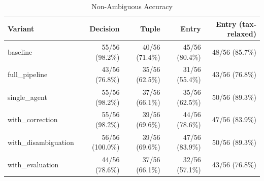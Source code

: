 \begin{table}[htbp]
\centering
\caption{Non-Ambiguous Accuracy}
\label{tab:acc-non-ambig}
\begin{tabular}{l rrrr}
\toprule
Variant & Decision & Tuple & Entry & Entry (tax-relaxed) \\
\midrule
  baseline & 55/56 (98.2\%) & 40/56 (71.4\%) & 45/56 (80.4\%) & 48/56 (85.7\%) \\
  full\_pipeline & 43/56 (76.8\%) & 35/56 (62.5\%) & 31/56 (55.4\%) & 43/56 (76.8\%) \\
  single\_agent & 55/56 (98.2\%) & 37/56 (66.1\%) & 35/56 (62.5\%) & 50/56 (89.3\%) \\
  with\_correction & 55/56 (98.2\%) & 39/56 (69.6\%) & 44/56 (78.6\%) & 47/56 (83.9\%) \\
  with\_disambiguation & 56/56 (100.0\%) & 39/56 (69.6\%) & 47/56 (83.9\%) & 50/56 (89.3\%) \\
  with\_evaluation & 44/56 (78.6\%) & 37/56 (66.1\%) & 32/56 (57.1\%) & 43/56 (76.8\%) \\
\bottomrule
\end{tabular}
\end{table}
